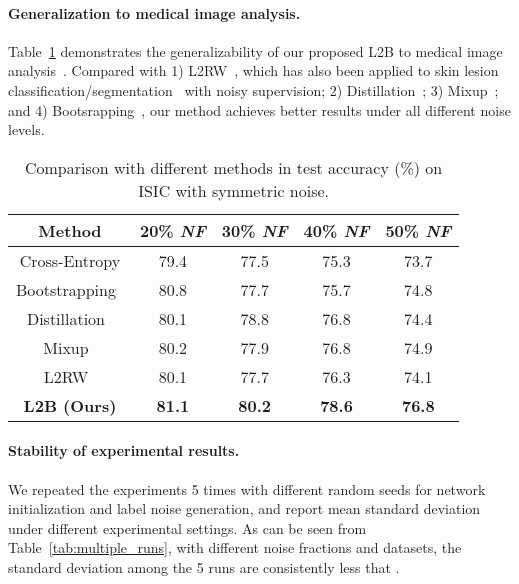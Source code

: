\documentclass{article}
\begin{document}
\paragraph{Generalization to medical image analysis.} Table~\ref{tab:ISIC} demonstrates the generalizability of our proposed L2B to medical image analysis~\cite{xue2019robust}. Compared with 1) L2RW~\cite{ren2018learning}, which has also been applied to skin lesion classification/segmentation~\cite{xue2019robust,mirikharaji2019learning} with noisy supervision; 2) Distillation~\cite{li2017learning}; 3)
Mixup~\cite{zhang2018mixup}; and 4) Bootsrapping~\cite{reed2014training}, our method achieves better results under all different noise levels.

\begin{table}[h!]
\footnotesize
\centering
\caption{Comparison with different methods in test accuracy (\%) on ISIC
with symmetric noise.}
\vspace{-1em}
\label{tab:ISIC}
\vspace{1ex}
\begin{tabular}{|c|c|c|c|c|}
\hline
Method  &20\% \emph{NF} &30\% \emph{NF} &40\% \emph{NF}  &50\% \emph{NF}  \\
 \hline
Cross-Entropy   &79.4 &77.5 &75.3 &73.7   \\
Bootstrapping~\cite{reed2014training}  &80.8 &77.7 &75.7  &74.8  \\
Distillation~\cite{li2017learning}  &80.1 &78.8 &76.8  &74.4  \\
Mixup~\cite{zhang2018mixup}  &80.2 &77.9 &76.8   &74.9 \\
L2RW~\cite{ren2018learning}  &80.1  &77.7 &76.3  &74.1   \\
\hline
\textbf{L2B (Ours)}  &\textbf{81.1} &\textbf{80.2} &\textbf{78.6} &\textbf{76.8}   \\
\hline
\end{tabular}
\end{table} 


 

   



    
\paragraph{Stability of experimental results.}
We repeated the experiments 5 times with different random seeds for network initialization and label noise generation, and report mean  standard deviation under different experimental settings. As can be seen from Table~\ref{tab:multiple_runs}, with different noise fractions and datasets, the standard deviation among the 5 runs are consistently less that .
\end{document}
